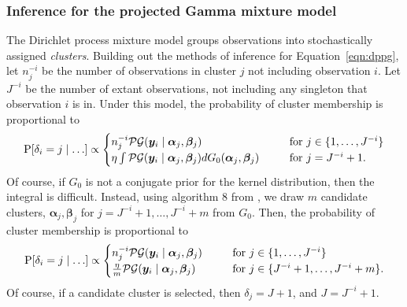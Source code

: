 \subsubsection{Inference for the projected Gamma mixture model}
The Dirichlet process mixture model groups observations into stochastically assigned \emph{clusters}.  Building out the methods of inference for Equation~\ref{eqn:dppg}, let $n_j^{-i}$ be the number of observations in cluster $j$ not including observation $i$.  Let $J^{-i}$ be the number of extant observations, not including any singleton that observation $i$ is in. Under this model, the probability of cluster membership is proportional to
\begin{equation*}
    \text{P}\left[\delta_i = j\mid\ldots\right] \propto \begin{cases}
        n_j^{-i}\mathcal{PG}\left(\bm{y}_i\mid\bm{\alpha}_j,\bm{\beta}_j\right)\hspace{0.5cm} &\text{~for~}j \in \lbrace 1,\ldots,J^{-i}\rbrace\\
        \eta\int\mathcal{PG}\left(\bm{y}_i\mid\bm{\alpha}_j,\bm{\beta}_j\right)dG_0(\bm{\alpha}_j,\bm{\beta}_j)\hspace{0.5cm} &\text{~for~}j = J^{-i} + 1.
        \end{cases}
\end{equation*}
Of course, if $G_0$ is not a conjugate prior for the kernel distribution, then the integral is difficult.  Instead, using algorithm 8 from \cite{neal2000}, we draw $m$ candidate clusters, $\bm{\alpha}_j,\bm{\beta}_j$ for $j = J^{-i} + 1,\ldots, J^{-i} + m$ from $G_0$. Then, the probability of cluster membership is proportional to
\begin{equation}
    \text{P}\left[\delta_i = j\mid\ldots\right] \propto \begin{cases}
        n_j^{-i}\mathcal{PG}\left(\bm{y}_i\mid\bm{\alpha}_j,\bm{\beta}_j\right)\hspace{0.5cm} &\text{~for~}j \in \lbrace 1,\ldots,J^{-i}\rbrace\\
        \frac{\eta}{m}\mathcal{PG}\left(\bm{y}_i\mid\bm{\alpha}_j,\bm{\beta}_j\right)\hspace{0.5cm} &\text{~for~}j \in \lbrace J^{-i} + 1,\ldots, J^{-i} + m\rbrace.
        \end{cases}
\end{equation}
Of course, if a candidate cluster is selected, then $\delta_j = J + 1$, and $J = J^{-i} + 1$.

